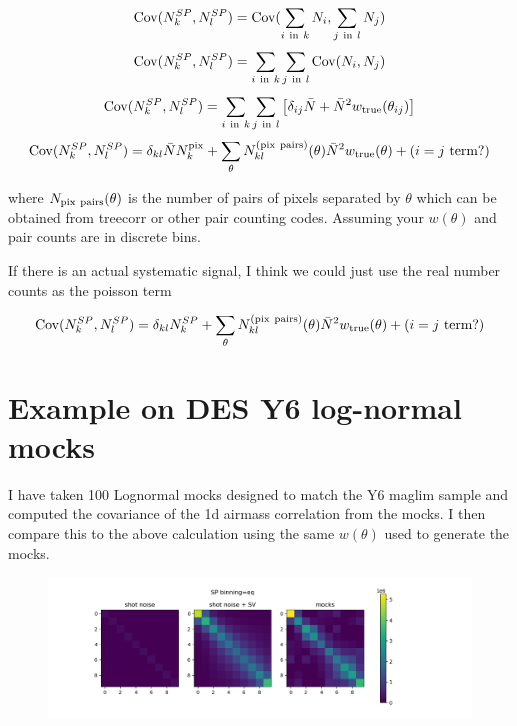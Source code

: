 \documentclass[12pt]{article}
\begin{document}
\begin{equation}
{\bf {\rm Cov}}(N^{SP}_k, N^{SP}_l) =  {\bf {\rm Cov}}( \sum_{i { \ \rm in \ } k} N_{i}, \sum_{j { \ \rm in \ } l} N_{j})
\end{equation}
\begin{equation}
{\bf {\rm Cov}}(N^{SP}_k, N^{SP}_l) =  \sum_{i { \ \rm in \ } k} \sum_{j { \ \rm in \ } l} {\bf {\rm Cov}}(N_i, N_j) 
\end{equation}
\begin{equation}
{\bf {\rm Cov}}(N^{SP}_k, N^{SP}_l) =  \sum_{i { \ \rm in \ } k} \sum_{j { \ \rm in \ } l} \left[ \delta_{ij}{\bar N} + {\bar N}^2 w_{\rm true}(\theta_{ij}) \right]
\end{equation}
\begin{equation}
{\bf {\rm Cov}}(N^{SP}_k, N^{SP}_l) =  \delta_{kl} {\bar N} N^{\rm pix}_{k} + \sum_{\theta} N^{\rm (pix \ pairs)}_{kl}(\theta) {\bar N}^2 w_{\rm true}(\theta) + {(i=j \ \rm term?)}
\end{equation}

where $N_{\rm pix \ pairs}(\theta)$ is the number of pairs of pixels separated by $\theta$ which can be obtained from treecorr or other pair counting codes. Assuming your $w(\theta)$ and pair counts are in discrete bins.

If there is an actual systematic signal, I think we could just use the real number counts as the poisson term

\begin{equation}
{\bf {\rm Cov}}(N^{SP}_k, N^{SP}_l) =  \delta_{kl} N^{SP}_{k} + \sum_{\theta} N^{\rm (pix \ pairs)}_{kl}(\theta) {\bar N}^2 w_{\rm true}(\theta) + {(i=j \ \rm term?)}
\end{equation}

\section{Example on DES Y6 log-normal mocks}

I have taken 100 Lognormal mocks designed to match the Y6 maglim sample and computed the covariance of the 1d airmass correlation from the mocks. I then compare this to the above calculation using the same $w(\theta)$ used to generate the mocks. 

\begin{figure}[h]
    \includegraphics[width=1.2\linewidth]{../test/cov_eq.png}
    \caption{}
    \label{fig:example}
\end{figure}
\end{document}
